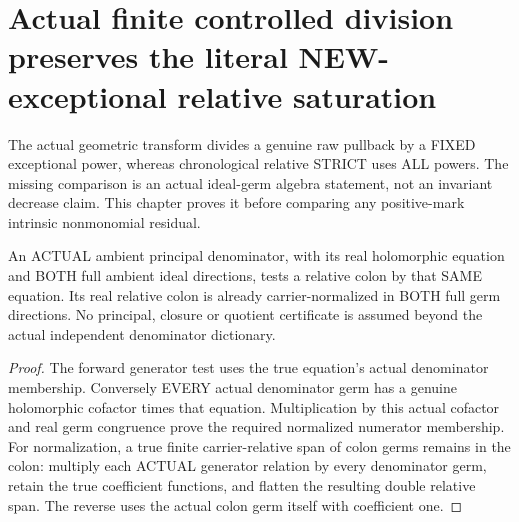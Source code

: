 \section{Actual finite controlled division preserves the literal NEW-exceptional relative saturation}

The actual geometric transform divides a genuine raw pullback by a FIXED
exceptional power, whereas chronological relative STRICT uses ALL powers.
The missing comparison is an actual ideal-germ algebra statement, not an
invariant decrease claim. This chapter proves it before comparing any
positive-mark intrinsic nonmonomial residual.

\begin{lemma}
\label{hir:sharp-actual-relative-colon-principal-test-normalization}
\leanok
An ACTUAL ambient principal denominator, with its real holomorphic equation
and BOTH full ambient ideal directions, tests a relative colon by that SAME
equation. Its real relative colon is already carrier-normalized in BOTH
full germ directions. No principal, closure or quotient certificate is
assumed beyond the actual independent denominator dictionary.
\end{lemma}
\begin{proof}
The forward generator test uses the true equation's actual denominator
membership. Conversely EVERY actual denominator germ has a genuine
holomorphic cofactor times that equation. Multiplication by this actual
cofactor and real germ congruence prove the required normalized numerator
membership. For normalization, a true finite carrier-relative span of
colon germs remains in the colon: multiply each ACTUAL generator relation
by every denominator germ, retain the true coefficient functions, and
flatten the resulting double relative span. The reverse uses the actual
colon germ itself with coefficient one.
\end{proof}

